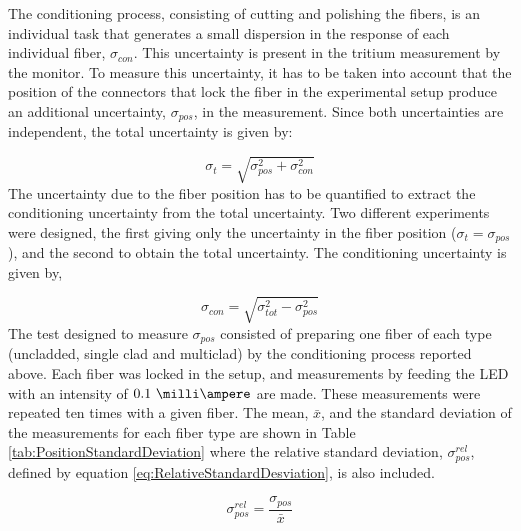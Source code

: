 The conditioning process, consisting of cutting and polishing the fibers, is an individual task that generates a small dispersion in the response of each individual fiber, $\sigma_{con}$. This uncertainty is present in the tritium measurement by the monitor. To measure this uncertainty, it has to be taken into account that the position of the connectors that lock the fiber in the experimental setup produce an additional uncertainty, $\sigma_{pos}$, in the measurement. Since both uncertainties are independent, the total uncertainty is given by:

\begin{equation}
\sigma_{t} = \sqrt{\sigma^2_{pos} + \sigma^2_{con} }
\label{eq:TotalUncertaintyFiberCharacterization}
\end{equation}
The uncertainty due to the fiber position has to be quantified to extract the conditioning uncertainty from the total uncertainty. Two different experiments were designed, the first giving only the uncertainty in the fiber position ($\sigma_{t} = \sigma_{pos}$), and the second to obtain the total uncertainty. The conditioning uncertainty is given by,

\begin{equation}
\sigma_{con} = \sqrt{\sigma^2_{tot} - \sigma^2_{pos} }
\label{eq:ConditioningUncertaintyFiberCharacterization}
\end{equation}
The test designed to measure $\sigma_{pos}$ consisted of preparing one fiber of each type (uncladded, single clad and multiclad) by the conditioning process reported above. Each fiber was locked in the setup, and measurements by feeding the LED with an intensity of $0.1~\milli\ampere$  are made. These measurements were repeated ten times with a given fiber. The mean, $\bar{x}$, and the standard deviation of the measurements for each fiber type are shown in Table \ref{tab:PositionStandardDeviation} where the relative standard deviation, $\sigma^{rel}_{pos}$, defined by equation \ref{eq:RelativeStandardDesviation}, is also included.

\begin{equation}
\sigma^{rel}_{pos} = \frac{\sigma_{pos}}{\bar{x}}
\label{eq:RelativeStandardDesviation}
\end{equation}

